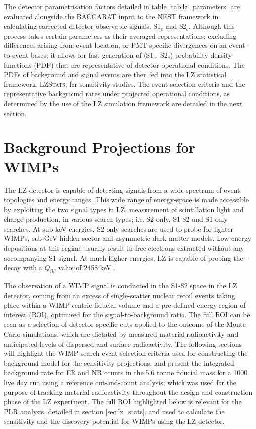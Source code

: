 The detector parametrisation factors detailed in table \ref{tab:lz_parameters} are evaluated alongside the \textsc{BACCARAT} input to the \textsc{NEST} framework in calculating corrected detector observable signals, S1$_{c}$ and S2$_{c}$. Although this process takes certain parameters as their averaged representations; excluding differences arising from event location, or PMT specific divergences on an event-to-event bases; it allows for fast generation of (S1$_{c}$, S2$_{c}$) probability density functions (PDF) that are representative of detector operational conditions. The PDFs of background and signal events are then fed into the LZ statistical framework, \textsc{LZStats}, for sensitivity studies. The event selection criteria and the representative background rates under projected operational conditions, as determined by the use of the LZ simulation framework are detailed in the next section.   



\section{Background Projections for WIMPs}
\label{sec:uclradon}

The LZ detector is capable of detecting signals from a wide spectrum of event topologies and energy ranges. This wide range of energy-space is made accessible by exploiting the two signal types in LZ, measurement of scintillation light and charge production, in various search types; i.e. S2-only, S1-S2 and S1-only searches. At sub-keV energies, S2-only searches are used to probe for lighter WIMPs, sub-GeV hidden sector and asymmetric dark matter models. Low energy depositions at this regime usually result in free electrons extracted without any accompanying S1 signal. At much higher energies, LZ is capable of probing the \XeOTS{} \neutrinolessDoubleBeta{}-decay with a $Q_{\beta \beta}$ value of 2458 keV \cite{Akerib_2020_double_beta}.

The observation of a WIMP signal is conducted in the S1-S2 space in the LZ detector, coming from an excess of single-scatter nuclear recoil events taking place within a WIMP centric fiducial volume and a pre-defined energy region of interest (ROI), optimised for the signal-to-background ratio. The full ROI can be seen as a selection of detector-specific cuts applied to the outcome of the Monte Carlo simulations, which are dictated by measured material radioactivity and anticipated levels of dispersed and surface radioactivity. The following sections will highlight the WIMP search event selection criteria used for constructing the background model for the sensitivity projections, and present the integrated background rate for ER and NR counts in the 5.6 tonne fiducial mass for a 1000 live day run using a reference cut-and-count analysis; which was used for the purpose of tracking material radioactivity throughout the design and construction phase of the LZ experiment. The full ROI highlighted below is relevant for the PLR analysis, detailed in section \ref{sec:lz_stats}, and used to calculate the sensitivity and the discovery potential for WIMPs using the LZ detector.


